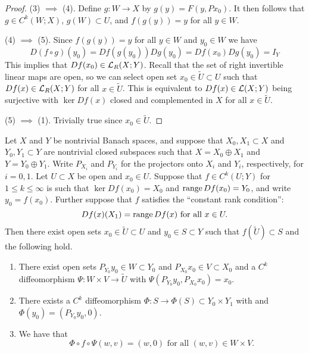 \documentclass[a4paper]{article}
\begin{document}
\begin{proof}
(3) $\implies$ (4). Define $g : W \to X$ by 
$g(y) = F(y, P x_0)$. It then follows that 
$g \in C^k(W; X)$, $g(W) \subset U$, 
and $f(g(y)) = y$ for all $y \in W$.

(4) $\implies$ (5). Since $f(g(y)) = y$ for all $y \in W$
and $y_0 \in W$ we have 
\[
D(f \circ g) (y_0) = Df(g(y_0)) Dg(y_0) 
= Df(x_0) Dg(y_0) = I_Y
\]
This implies that $Df(x_0) \in \mathcal{L}_R (X; Y)$. Recall 
that the set of right invertible linear maps are open, so 
we can select open set $x_0 \in \tilde{U} \subset U$ such 
that $Df(x) \in \mathcal{L}_R(X; Y)$ for all $x \in \tilde{U}$. 
This is equivalent to $Df(x) \in \mathcal{L}(X; Y)$ being surjective 
with $\ker Df(x)$ closed and complemented in $X$ for all 
$x \in \tilde{U}$. 

(5) $\implies$ (1). Trivially true since $x_0 \in \tilde{U}$.
\end{proof}

\begin{thm}
Let $X$ and $Y$ be nontrivial Banach spaces, and suppose 
that $X_0,X_1 \subset X$ and $Y_0,Y_1 \subset Y$ are 
nontrivial closed subspaces such that $X = X_0 \oplus 
X_1$ and $Y = Y_0 \oplus Y_1$.  Write $P_{X_i}$ and 
$P_{Y_i}$ for the projectors onto $X_i$ and $Y_i$, 
respectively, for $i=0,1$.  Let $U \subset X$ be 
open and $x_0 \in U$.  Suppose that $f \in C^k(U;Y)$ 
for $1 \le k\le \infty$ is such that $\ker Df(x_0) = 
X_0$ and $\operatorname{range} Df(x_0) = Y_0$, and write $y_0 = f(x_0)$.  
Further suppose that $f$ satisfies the ``constant rank 
condition'':
\[
Df(x) (X_1) = \operatorname{range} Df(x) \text{ for all }x \in U. 
\]
Then there exist open sets $x_0 \in \tilde{U} \subset U$ 
and $y_0 \in S \subset Y$ such that $f(\tilde{U}) 
\subset S$ and the following hold.
\begin{enumerate} 
\item There exist open sets $P_{Y_0} y_0 \in W \subset 
Y_0$ and $P_{X_0} x_0 \in V \subset X_0$ and a $C^k$ 
diffeomorphism $\Psi: W \times V \to \tilde{U}$ with 
$\Psi(P_{Y_0} y_0, P_{X_0} x_0) = x_0$.

\item There exists a $C^k$ diffeomorphism $\Phi : S \to 
\Phi(S) \subset Y_0 \times Y_1$ with  
and $\Phi(y_0) = (P_{Y_0} y_0, 0)$.

\item We have that 
\[
\Phi \circ f \circ \Psi(w,v) = (w,0) \text{ for all } 
(w, v) \in W \times V.
\]
\end{enumerate}
\end{thm}
\end{document}
